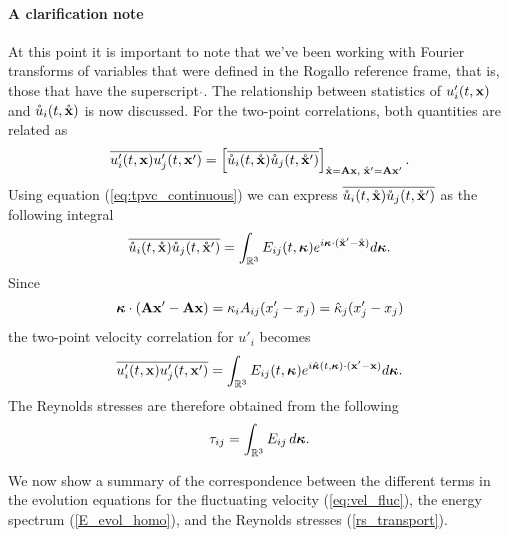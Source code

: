 \documentclass[oneside,a4paper,11pt]{report}
\newcommand{\ufluc}{u'}
\newcommand{\rs}{\tau}          %
\newcommand{\est}{E}            %
\newcommand{\kappavec}{\boldsymbol{\kappa}}
\begin{document}
\paragraph{A clarification note}
At this point it is important to note that we've been working with Fourier transforms of variables that were defined in the Rogallo reference frame, that is, those that have the superscript $\mathring{}$. The relationship between statistics of $\ufluc_i(t,\xvec)$ and $\mathring{u}_i(t,\mathring{\mathbf{x}})$ is now discussed. For the two-point correlations, both quantities are related as
\begin{equation}
\overline{ \ufluc_i(t,\xvec) \ufluc_j(t,\xvec') } = \left [ \overline{ \urog_i(t,\xrogvec) \urog_j(t,\xrogvec') } \right ]_{\xrogvec = \mathbf{A}\xvec, \; \xrogvec' = \mathbf{A}\xvec'}.
\end{equation}
Using equation (\ref{eq:tpvc_continuous}) we can express $\overline{ \mathring{u}_i(t,\mathring{\mathbf{x}}) \mathring{u}_j(t,\mathring{\mathbf{x}}') }$ as the following integral
\begin{equation}
\overline{ \urog_i(t,\xrogvec) \urog_j(t,\xrogvec') } = \int_\Rthree E_{ij}(t,\kappavec) e^{i\kappavec \cdot (\xrogvec' - \xrogvec)} d\kappavec.
\end{equation}
Since
\begin{equation}
\kappavec \cdot ( \mathbf{A} \xvec' - \mathbf{A} \xvec) = \kappa_iA_{ij} (x'_j - x_j) = \hat{\kappa}_j (x'_j - x_j)
\end{equation}
the two-point velocity correlation for $\ufluc_i$ becomes
\begin{equation}
\overline{ \ufluc_i(t,\xvec) \ufluc_j(t,\xvec') } = \int_\Rthree E_{ij}(t,\kappavec) e^{i \hat{\kappavec}(t,\kappavec) \cdot ( \xvec' - \xvec)} d\kappavec .
\end{equation}
The Reynolds stresses are therefore obtained from the following
\begin{equation}
\rs_{ij} = \int_\Rthree \est_{ij} \, d\kappavec.
\end{equation}

We now show a summary of the correspondence between the different terms in the evolution equations for the fluctuating velocity (\ref{eq:vel_fluc}), the energy spectrum (\ref{E_evol_homo}), and the Reynolds stresses (\ref{rs_transport}).
\end{document}
